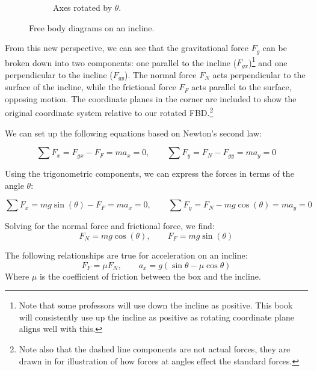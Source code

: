 \begin{figure}[htbp]
\begin{subfigure}{0.4\textwidth}
        \caption{Axes rotated by $\theta$.}
        \label{fig:fbd-rotated}
    \end{subfigure}
    \caption{Free body diagrams on an incline.}
    \label{fig:fbd-both}
\end{figure}

From this new perspective, we can see that the gravitational force $F_g$ can be broken down into two components: one parallel to the incline ($F_{gx}$)\footnote{Note that some professors will use down the incline as positive. This book will consistently use up the incline as positive as rotating coordinate plane aligns well with this.} and one perpendicular to the incline ($F_{gy}$). The normal force $F_N$ acts perpendicular to the surface of the incline, while the frictional force $F_F$ acts parallel to the surface, opposing motion. The coordinate planes in the corner are included to show the original coordinate system relative to our rotated FBD.\footnote{Note also that the dashed line components are not actual forces, they are drawn in for illustration of how forces at angles effect the standard forces.}
  
We can set up the following equations based on Newton's second law:

$$\sum F_x = F_{gx} - F_F = m a_x = 0,\qquad \sum F_y = F_N - F_{gy} = m a_y = 0$$

Using the trigonometric components, we can express the forces in terms of the angle $\theta$:

$$\sum F_x = mg\sin(\theta) - F_F = m a_x = 0,\qquad \sum F_y = F_N - mg\cos(\theta) = m a_y = 0$$

Solving for the normal force and frictional force, we find:
$$F_N = mg\cos(\theta),\qquad F_F = mg\sin(\theta)$$

The following relationships are true for acceleration on an incline:
$$F_F = \mu F_N, \qquad a_x = g(\sin\theta - \mu \cos\theta)$$
Where $\mu$ is the coefficient of friction between the box and the incline.

